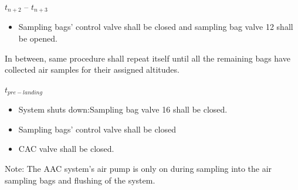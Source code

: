 $t_{n+2}$ – $t_{n+3}$
\begin{itemize}
    \item Sampling bags' control valve shall be closed and sampling bag valve 12 shall be opened.
\end{itemize}

In between, same procedure shall repeat itself until all the remaining bags have collected air samples for their assigned altitudes.

$t_{pre-landing}$
\begin{itemize}
    \item System shuts down:Sampling bag valve 16 shall be closed.
    \item Sampling bags' control valve shall be closed
    \item CAC valve shall be closed.
\end{itemize}


Note: The AAC system's air pump is only on during sampling into the air sampling bags and flushing of the system.

\raggedbottom